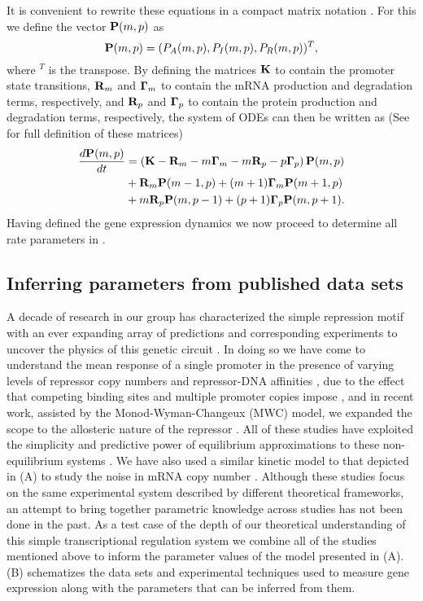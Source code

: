 It is convenient to rewrite these equations in a compact matrix notation
\cite{Sanchez2013}. For this we define the vector $\mathbf{P}(m, p)$ as
\begin{equation}
  \mathbf{P}(m, p) = (P_A(m, p), P_I(m, p), P_R(m, p))^T,
\end{equation}
where $^T$ is the transpose. By defining the matrices $\mathbf{K}$ to contain the
promoter state transitions, $\mathbf{R}_m$ and $\mathbf{\Gamma}_m$ to contain the mRNA production and
degradation terms, respectively, and $\mathbf{R}_p$ and $\mathbf{\Gamma}_p$ to contain the protein
production and degradation terms, respectively, the system of ODEs can then be
written as (See  for full definition of these matrices)
\begin{equation}
  \begin{aligned}
    {d{\mathbf{P}(m, p)} \over dt} &= \left( \mathbf{K} -\mathbf{R}_m -m\mathbf{\Gamma}_m -m\mathbf{R}_p -p\mathbf{\Gamma}_p \right) \mathbf{P}(m, p)\\
    &+ \mathbf{R}_m \mathbf{P}(m-1, p)
    + (m + 1) \mathbf{\Gamma}_m \mathbf{P}(m + 1, p)\\
    &+ m \mathbf{R}_p \mathbf{P}(m, p - 1)
    + (p + 1) \mathbf{\Gamma}_p \mathbf{P}(m, p + 1).
  \end{aligned}
  \label{eq_cme_matrix}
\end{equation}
Having defined the gene expression dynamics we now proceed to determine all 
rate parameters in .

\subsection{Inferring parameters from published data sets}
\label{sec_param}

A decade of research in our group has characterized the simple repression motif
with an ever expanding array of predictions and corresponding experiments to
uncover the physics of this genetic circuit \cite{Phillips2019}. In doing so we
have come to understand the mean response of a single promoter in the presence
of varying levels of repressor copy numbers and repressor-DNA affinities
\cite{Garcia2011c}, due to the effect that competing binding sites and multiple
promoter copies impose \cite{Brewster2014}, and in recent work, assisted by the
Monod-Wyman-Changeux (MWC) model, we expanded the scope to the allosteric nature
of the repressor \cite{Razo-Mejia2018}. All of these studies have exploited the
simplicity and predictive power of equilibrium approximations to these
non-equilibrium systems \cite{Buchler2003}. We have also used a similar kinetic
model to that depicted in (A) to study the noise in
mRNA copy number \cite{Jones2014a}. Although these studies focus on the same
experimental system described by different theoretical frameworks, an attempt to
bring together parametric knowledge across studies has not been done in the
past. As a test case of the depth of our theoretical understanding of this
simple transcriptional regulation system we combine all of the studies mentioned
above to inform the parameter values of the model presented in
(A). (B) schematizes the data
sets and experimental techniques used to measure gene expression along with the
parameters that can be inferred from them.

